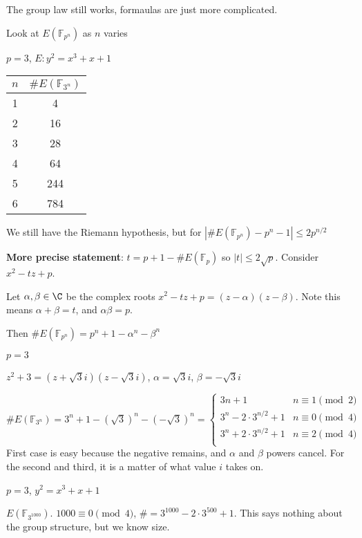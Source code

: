 \documentclass[10pt]{article}
\newcommand{\F}{\mathbb{F}}
\begin{document}
The group law still works, formaulas are just more complicated.

Look at $E(\F_{p^n})$ as $n$ varies

\begin{exm*}
    $p = 3$, $E: y^2 = x^3 + x + 1$
\end{exm*}
\begin{tabular}{c|c}
    $n$ & $\#E(\F_{3^n})$\\
    \hline
    1 & 4\\
    2 & 16 \\
    3 & 28\\
    4 & 64\\
    5 & 244\\
    6 & 784\\
\end{tabular}

We still have the Riemann hypothesis, but for $|\#E(\F_{p^n}) - p^n - 1 | \leq 2p^{n/2}$

\textbf{More precise statement}: $t = p + 1 - \#E(\F_p)$ so $|t| \leq 2\sqrt{p}$. Consider $x^2 - tz + p$. 

Let $\alpha, \beta\in \C$ be the complex roots $x^2 - tz + p = (z - \alpha)(z - \beta)$. Note this means $\alpha + \beta = t$, and $\alpha\beta = p$. 

Then $\#E(\F_{p^n}) = p^n + 1 - \alpha^n - \beta^n$

\begin{exm*}
    $p = 3$
\end{exm*}
$z^2 + 3 = (z + \sqrt{3}i)(z - \sqrt{3}i)$, $\alpha = \sqrt{3}i$, $\beta = -\sqrt{3}i$

$\#E(\F_{3^n}) = 3^n + 1 - (\sqrt{3})^n - (-\sqrt{3})^n = \begin{cases}
    3n + 1 & n\equiv 1 \pmod{2}\\
    3^n - 2\cdot3^{n/2}+1 & n \equiv 0 \pmod{4}\\
    3^n + 2\cdot3^{n/2}+1 & n\equiv 2 \pmod{4}\\
\end{cases}$
First case is easy because the negative remains, and $\alpha$ and $\beta$ powers cancel. For the second and third, it is a matter of what value $i$ takes on.

\begin{exm*}
    $p = 3$, $y^2 = x^3 + x + 1$
\end{exm*}
$E(\F_{3^{1000}})$. $1000 \equiv 0 \pmod{4}$, $\# = 3^{1000}-2\cdot3^{500} + 1$. This says nothing about the group structure, but we know size.
\end{document}

